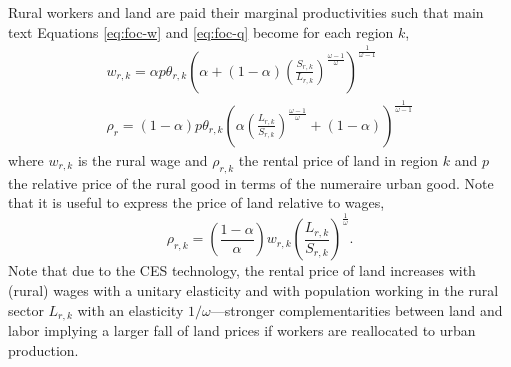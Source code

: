 \documentclass[11pt]{report}
\begin{document}
Rural workers and land are paid their marginal productivities such that main text Equations \eqref{eq:foc-w} and \eqref{eq:foc-q} become for each region $k$,
\begin{eqnarray}
w_{r,k}=\alpha p\theta_{r,k}\left(\alpha  +(1-\alpha)\left(\frac{S_{r,k}}{L_{r,k}}\right)^{\frac{\omega-1}{\omega}} \right)^{\frac{1}{\omega-1}} \label{B-eq:foc-wr}\\
\rho_r=(1-\alpha)p\theta_{r,k}\left(\alpha \left(\frac{L_{r,k}}{S_{r,k}}\right)^{\frac{\omega-1}{\omega}} +(1-\alpha) \right)^{\frac{1}{\omega-1}} \label{B-eq:foc-q}
\end{eqnarray}
where $w_{r,k}$ is the rural wage and $\rho_{r,k}$ the rental price of land in region $k$ and $p$ the relative price of the rural good in terms of the numeraire urban good. Note that it is useful to express the price of land relative to wages,
\begin{equation}
\rho_{r,k}=\left( \frac{1-\alpha}{\alpha}\right) w_{r,k}\left(\frac{L_{r,k}}{S_{r,k}}\right)^{\frac{1}{\omega}}. \label{B-eq:relative-SLdemand2}
\end{equation}
Note that due to the CES technology, the rental price of land increases with (rural) wages with a unitary elasticity and with population working in the rural sector $L_{r,k}$ with an elasticity $1/\omega$---stronger complementarities between land and labor implying a larger fall of land prices if workers are reallocated to urban production. 
\end{document}

